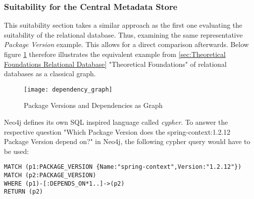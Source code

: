 \subsubsection{Suitability for the Central Metadata Store}
This suitability section takes a similar approach as the first one evaluating the suitability of the relational database. Thus, examining the same representative \emph{Package Version} example. This allows for a direct comparison afterwards. Below figure \ref{fig:PackageVersionsAndDependenciesGraph} therefore illustrates the equivalent example from \ref{sec:Theoretical Foundations Relational Database} "Theoretical Foundations" of relational databases as a classical graph.

\begin{figure}[H]
	\centering
	\texttt{[image: dependency\_graph]}
	\caption[Package Versions and Dependencies as Graph]{Package Versions and Dependencies as Graph }
	\label{fig:PackageVersionsAndDependenciesGraph}
\end{figure}

Neo4j defines its own SQL inspired language called \emph{cypher}. To answer the respective question "Which Package Version does the spring-context:1.2.12 Package Version depend on?" in Neo4j, the following cypher query would have to be used:

\begin{lstlisting}[caption=Package Version Dependencies (including transitive), captionpos=b, label=lst:CypherTransitive]
MATCH (p1:PACKAGE_VERSION {Name:"spring-context",Version:"1.2.12"})
MATCH (p2:PACKAGE_VERSION)
WHERE (p1)-[:DEPENDS_ON*1..]->(p2)
RETURN (p2)
\end{lstlisting}

